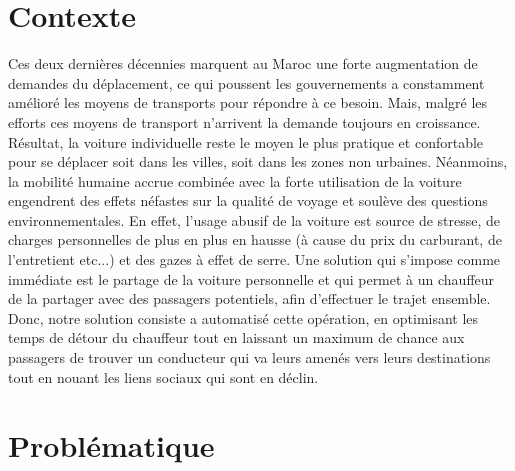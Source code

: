 
\section{Contexte}

Ces deux dernières décennies marquent au Maroc une forte augmentation de demandes du déplacement, ce qui poussent les gouvernements a constamment amélioré les moyens de transports pour répondre à ce besoin.\newline
Mais, malgré les efforts ces moyens de transport n'arrivent la demande toujours en croissance.\newline
Résultat, la voiture individuelle reste le moyen le plus pratique et confortable pour se déplacer soit dans les villes, soit dans les zones non urbaines. Néanmoins, la mobilité humaine accrue combinée avec la forte utilisation de la voiture engendrent des effets néfastes sur la qualité de voyage et soulève des questions environnementales.\newline
En effet, l'usage abusif de la voiture est source de stresse, de charges personnelles de plus en plus en hausse (à cause du prix du carburant, de l'entretient etc...) et des gazes à effet de serre.\newline
Une solution qui s'impose comme immédiate est le partage de la voiture personnelle et qui permet à un chauffeur de la partager avec des passagers potentiels, afin d'effectuer le trajet ensemble.\newline
Donc, notre solution consiste a automatisé cette opération, en optimisant les temps de détour du chauffeur tout en laissant un maximum de chance aux passagers de trouver un conducteur qui va leurs amenés vers leurs destinations tout en nouant les liens sociaux qui sont en déclin.

\section{Problématique}


